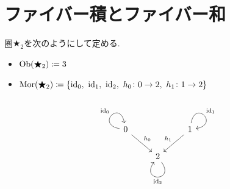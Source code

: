 
\section{ファイバー積とファイバー和}

\begin{definition} \label{def: WalkingCospanCategory}
圏$\bigstar_2$を次のようにして定める.\
\begin{itemize}
	\item $\operatorname{Ob}(\bigstar_2) \coloneq 3$
	\item $\Mor(\bigstar_2) \coloneq \{\id_0,\ \id_1,\ \id_2,\ h_0 \colon 0 \to 2,\ h_1 \colon 1 \to 2\}$
\end{itemize}
\[\begin{tikzcd}
	0 && 1 \\
	& 2
	\arrow["{\id_0}", from=1-1, to=1-1, loop, in=100, out=170, distance=10mm]
	\arrow["{h_0}", from=1-1, to=2-2]
	\arrow["{\id_1}", from=1-3, to=1-3, loop, in=10, out=80, distance=10mm]
	\arrow["{h_1}"', from=1-3, to=2-2]
	\arrow["{\id_2}", from=2-2, to=2-2, loop, in=235, out=305, distance=10mm]
\end{tikzcd}\]
\end{definition}


